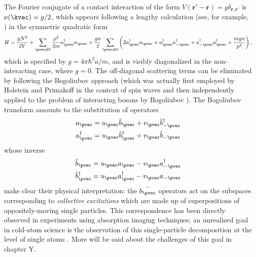	The Fourier conjugate of a contact interaction of the form $V(\textbf{r}'-\textbf{r})=g\delta_{\textbf{r},\textbf{r}'}$ is $\nu(\kvec)=g/2$, which appears 	following a lengthy calculation (see, for example, \cite{PitaevskiiStringari}) in the symmetric quadratic form
	\begin{equation}
		H = \frac{gN^2}{2V} + \sum_{\pvec\neq0}\frac{p^2}{2m}a^\dagger_\pvec a_\pvec + \frac{gn}{2}\sum_{\pvec\neq0}\left(2a^\dagger_\pvec a_\pvec + a^\dagger_\pvec a^\dagger_{-\pvec} + a^\dagger_{-\pvec} a^\dagger_{\pvec} + \frac{mgn}{p^2}\right),
		\label{eqn:bog_H}
	\end{equation}
	which is specified by $g=4\pi\hbar^2a/m$, and is visibly diagonalized in the non-interacting case, where $g=0$. The off-diagonal scattering terms can be eliminated by following the Bogoliubov approach (which was actually first employed by Holstein and Primakoff in the context of spin waves \cite{schwabl} and then independently applied to the problem of interacting bosons by Bogoliubov \cite{bologiubov47}). The Bogoliubov transform amounts to the substitution of operators
	\begin{align}
		a_\pvec &= u_\pvec \hat{b}_\pvec + v_\pvec \hat{b}^\dagger_{-\pvec}\\
		a_\pvec^\dagger &= u_\pvec\hat{b}_\pvec^\dagger + v_\pvec \hat{b}_{-\pvec}
		\label{bogotrans}
	\end{align}
	whose inverse
	\begin{align}
		\hat{b}_\pvec &= u_\pvec a_\pvec - v_\pvec a^\dagger_{-\pvec}\\
		\hat{b}_\pvec^\dagger &= u_\pvec a_\pvec^\dagger - v_\pvec a_{-\pvec}
		\label{bogoinverse}
	\end{align}
	make clear their physical interpretation: the $\hat{b_\pvec}$ operators act on the subspaces corresponding to \emph{collective excitations} which are made up of superpositions of oppositely-moving single particles. This correspondence has been directly observed in experiments \cite{vogels02} using absorption imaging techniques; an unrealized goal in cold-atom science is the observation of this single-particle decomposition at the level of single atoms . More will be said about the challenges of this goal in chapter Y. 
	
